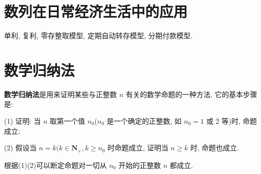 \documentclass[titlepage]{ctexart}
\begin{document}
\section{数列在日常经济生活中的应用}

单利, 复利, 零存整取模型, 定期自动转存模型, 分期付款模型.


\section{数学归纳法}

\textbf{数学归纳法}是用来证明某些与正整数 $n$ 有关的数学命题的一种方法. 它的基本步骤是:

(1) 证明: 当 $n$ 取第一个值 $n_0$($n_0$ 是一个确定的正整数, 如 $n_0 = 1$ 或 2 等)时, 命题成立;

(2) 假设当 $n = k(k \in \mathbf{N_+}, k \geqslant n_0$ 时命题成立, 证明当 $n \geqslant k$ 时, 命题也成立. 

根据(1)(2)可以断定命题对一切从 $n_0$ 开始的正整数 $n$ 都成立.
\end{document}
